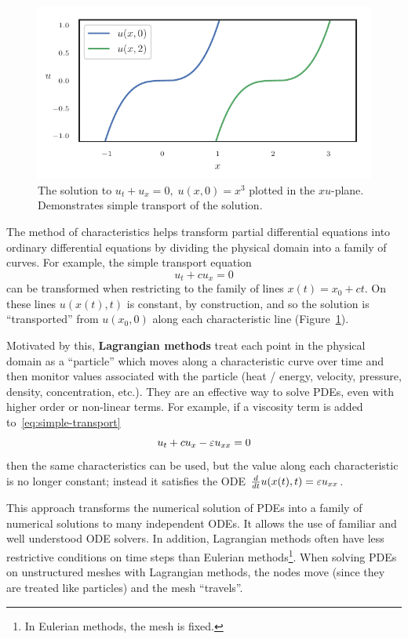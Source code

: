 \begin{figure}
  \includegraphics{../images/curved-mesh/simple_transport.pdf}
  \centering
  \captionsetup{width=.75\linewidth}
  \caption{The solution to \(u_t + u_x = 0, \; u(x, 0) = x^3\) plotted in
    the \(xu\)-plane. Demonstrates simple transport of
    the solution.}
  \label{fig:simple-transport}
\end{figure}

The method of characteristics helps transform partial differential equations
into ordinary differential equations by dividing the physical domain into
a family of curves. For example, the simple transport equation
\begin{equation}\label{eq:simple-transport}
u_t + c u_x = 0
\end{equation}
can be transformed when restricting to the family of lines
\(x(t) = x_0 + c t\). On these lines \(u(x(t), t)\) is constant, by
construction, and so the solution is ``transported'' from \(u(x_0, 0)\)
along each characteristic line (Figure~\ref{fig:simple-transport}).

Motivated by this, \textbf{Lagrangian methods} treat each point in the
physical domain as a ``particle'' which moves along a characteristic curve
over time and then monitor values associated with the particle (heat / energy,
velocity, pressure, density, concentration, etc.). They are an effective way
to solve PDEs, even with higher order or non-linear terms.
For example, if a viscosity term is added to~\eqref{eq:simple-transport}
\begin{equation}
u_t + c u_x - \varepsilon u_{xx} = 0
\end{equation}
then the same characteristics can be used, but the value
along each characteristic is no longer constant; instead it satisfies the
ODE \(\frac{d}{dt} u(x(t), t) = \varepsilon u_{xx}\).

This approach transforms the numerical solution of PDEs into a family of
numerical solutions to many independent ODEs. It allows the use of familiar
and well understood ODE solvers. In addition, Lagrangian methods often
have less restrictive conditions on time steps than Eulerian
methods\footnote{In Eulerian methods, the mesh is fixed.}.
When solving PDEs on unstructured meshes
with Lagrangian methods, the nodes move (since they
are treated like particles) and the mesh ``travels''.

